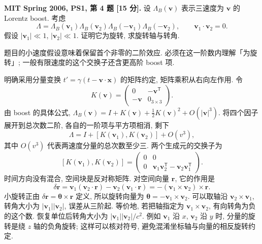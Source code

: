 \begin{exercise}
\textbf{MIT Spring 2006, PS1, 第 4 题 [15 分].}
设 $\Lambda_B(\boldsymbol v)$ 表示三速度为 $\boldsymbol v$ 的 Lorentz boost. 考虑
\[
 \Lambda=\Lambda_B(\boldsymbol v_1)\Lambda_B(\boldsymbol v_2)
 \Lambda_B(-\boldsymbol v_1)\Lambda_B(-\boldsymbol v_2),
 \qquad \boldsymbol v_1\cdot\boldsymbol v_2=0.
\]
假设 $|\boldsymbol v_1|\ll1$, $|\boldsymbol v_2|\ll1$. 证明它为旋转, 求旋转轴与转角.
\end{exercise}
\begin{solution}
题目的小速度假设意味着保留首个非零的二阶效应. 必须在这一阶数内理解「为旋转」; 一般有限速度的这个交换子还含更高阶 boost 项.

明确采用分量变换 $t'=\gamma(t-\boldsymbol v\cdot\boldsymbol x)$ 的矩阵约定, 矩阵乘积从右向左作用. 令
\[
 K(\boldsymbol v)=\begin{pmatrix}0&-\boldsymbol v^{\mathsf T}\\
 -\boldsymbol v&0_{3\times3}\end{pmatrix}.
\]
由 boost 的具体公式, $\Lambda_B(\boldsymbol v)=I+K(\boldsymbol v)+\tfrac12K(\boldsymbol v)^2+O(|\boldsymbol v|^3)$. 将四个因子展开到总次数二阶, 各自的一阶项与平方项相消, 剩下
\[
 \Lambda=I+[K(\boldsymbol v_1),K(\boldsymbol v_2)]+O(v^3),
\]
其中 $O(v^3)$ 代表两速度分量的总次数至少三. 两个生成元的交换子为
\[
 [K(\boldsymbol v_1),K(\boldsymbol v_2)]
 =\begin{pmatrix}0&0\\0&
 \boldsymbol v_1\boldsymbol v_2^{\mathsf T}
 -\boldsymbol v_2\boldsymbol v_1^{\mathsf T}\end{pmatrix}.
\]
时间方向没有混合, 空间块是反对称矩阵. 对空间向量 $\boldsymbol r$, 它的作用是
\[
 \delta\boldsymbol r
 =\boldsymbol v_1(\boldsymbol v_2\cdot\boldsymbol r)
 -\boldsymbol v_2(\boldsymbol v_1\cdot\boldsymbol r)
 =-(\boldsymbol v_1\times\boldsymbol v_2)\times\boldsymbol r.
\]
小旋转正由 $\delta\boldsymbol r=\boldsymbol\theta\times\boldsymbol r$ 定义, 所以旋转向量为 $\boldsymbol\theta=-\boldsymbol v_1\times\boldsymbol v_2$. 可以取轴沿 $\boldsymbol v_2\times\boldsymbol v_1$, 转角大小为 $|\boldsymbol v_1||\boldsymbol v_2|$, 误差从三阶起. 等价地, 若把轴指定为 $\boldsymbol v_1\times\boldsymbol v_2$, 有向转角为负的这个数. 恢复单位后转角大小为 $|\boldsymbol v_1||\boldsymbol v_2|/c^2$. 例如 $\boldsymbol v_1$ 沿 $x$, $\boldsymbol v_2$ 沿 $y$ 时, 分量的旋转是绕 $z$ 轴的负角旋转; 这样可以核对符号, 避免混淆坐标轴与向量的相反旋转约定.
\end{solution}

